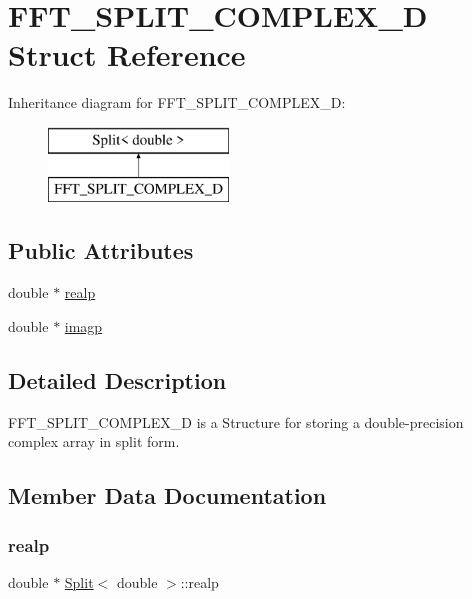 \hypertarget{struct_double_split}{}\section{F\+F\+T\+\_\+\+S\+P\+L\+I\+T\+\_\+\+C\+O\+M\+P\+L\+E\+X\+\_\+D Struct Reference}
\label{struct_double_split}
Inheritance diagram for F\+F\+T\+\_\+\+S\+P\+L\+I\+T\+\_\+\+C\+O\+M\+P\+L\+E\+X\+\_\+D\+:\begin{figure}[H]
\begin{center}
\leavevmode
\includegraphics[height=2.000000cm]{struct_double_split}
\end{center}
\end{figure}
\subsection*{Public Attributes}
\begin{DoxyCompactItemize}
\item 
double $\ast$ \hyperlink{struct_split_aaadcedfa082d6f07b33cd89ea4f19814}{realp}
\item 
double $\ast$ \hyperlink{struct_split_a21ff23a96abee0c0ed6a2433798c4eac}{imagp}
\end{DoxyCompactItemize}


\subsection{Detailed Description}
F\+F\+T\+\_\+\+S\+P\+L\+I\+T\+\_\+\+C\+O\+M\+P\+L\+E\+X\+\_\+D is a Structure for storing a double-\/precision complex array in split form. 

\subsection{Member Data Documentation}
\mbox{\label{struct_split_aaadcedfa082d6f07b33cd89ea4f19814}} 
\subsubsection{\texorpdfstring{realp}{realp}}
{\footnotesize\ttfamily double $\ast$ \hyperlink{struct_split}{Split}$<$ double  $>$\+::realp\hspace{0.3cm}{\ttfamily [inherited]}}

